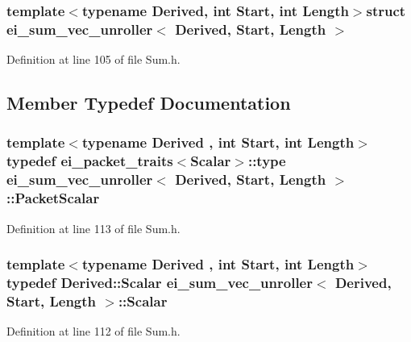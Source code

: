 \subsubsection*{template$<$typename Derived, int Start, int Length$>$struct ei\-\_\-sum\-\_\-vec\-\_\-unroller$<$ Derived, Start, Length $>$}



Definition at line 105 of file Sum.\-h.



\subsection{Member Typedef Documentation}
\hypertarget{structei__sum__vec__unroller_a27ccb05e1f469ad400ab851e2a361a94}{
\subsubsection[{Packet\-Scalar}]{\setlength{\rightskip}{0pt plus 5cm}template$<$typename Derived , int Start, int Length$>$ typedef {\bf ei\-\_\-packet\-\_\-traits}$<${\bf Scalar}$>$\-::{\bf type} {\bf ei\-\_\-sum\-\_\-vec\-\_\-unroller}$<$ Derived, Start, Length $>$\-::{\bf Packet\-Scalar}}}\label{structei__sum__vec__unroller_a27ccb05e1f469ad400ab851e2a361a94}


Definition at line 113 of file Sum.\-h.

\hypertarget{structei__sum__vec__unroller_a50f5b978ee253c4fce0eb589190590e8}{
\subsubsection[{Scalar}]{\setlength{\rightskip}{0pt plus 5cm}template$<$typename Derived , int Start, int Length$>$ typedef Derived\-::\-Scalar {\bf ei\-\_\-sum\-\_\-vec\-\_\-unroller}$<$ Derived, Start, Length $>$\-::{\bf Scalar}}}\label{structei__sum__vec__unroller_a50f5b978ee253c4fce0eb589190590e8}


Definition at line 112 of file Sum.\-h.



